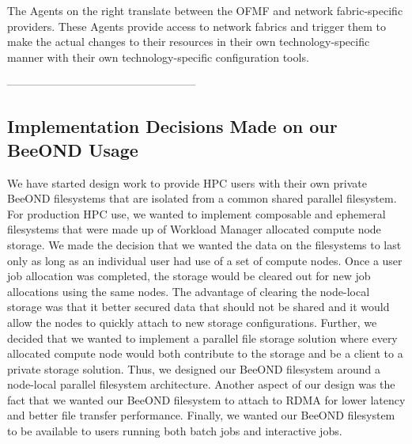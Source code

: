 The Agents on the right translate between the OFMF and network fabric-specific providers.  These Agents provide access to network fabrics and trigger them to make the actual changes to their resources in their own technology-specific manner with their own technology-specific configuration tools.  



---------------------------------------------------


\subsection{Implementation Decisions Made on our BeeOND Usage}

We have started design work to provide HPC users with their own private BeeOND filesystems that are isolated from a common shared parallel filesystem.  For production HPC use, we wanted to implement composable and ephemeral filesystems that were made up of Workload Manager allocated compute node storage.  We made the decision that we wanted the data on the filesystems to last only as long as an individual user had use of a set of compute nodes.  Once a user job allocation was completed, the storage would be cleared out for new job allocations using the same nodes.  The advantage of clearing the node-local storage was that it better secured data that should not be shared and it would allow the nodes to quickly attach to new storage configurations.  Further, we decided that we wanted to implement a parallel file storage solution where every allocated compute node would both contribute to the storage and be a client to a private storage solution.  Thus, we designed our BeeOND filesystem around a node-local parallel filesystem architecture.  Another aspect of our design was the fact that we wanted our BeeOND filesystem to attach to RDMA for lower latency and better file transfer performance.  Finally, we wanted our BeeOND filesystem to be available to users running both batch jobs and interactive jobs.  

